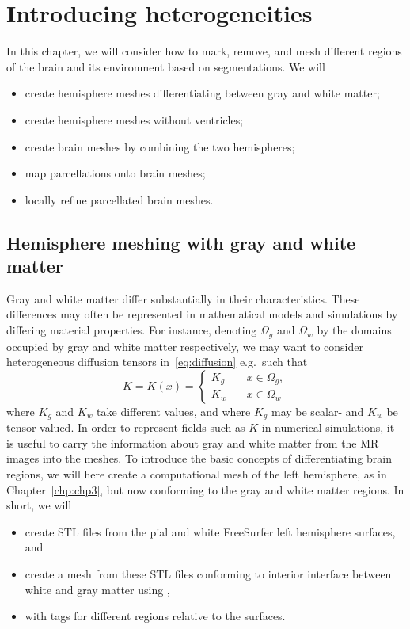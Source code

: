 \chapter{Introducing heterogeneities}
\label{chp:chp4}

In this chapter, we will consider how to mark, remove, and mesh
different regions of the brain and its environment based on
{\freesurfer} segmentations. We will
\begin{itemize}
\item
  create hemisphere meshes differentiating between gray and white matter;
\item
  create hemisphere meshes without ventricles;
\item
  create brain meshes by combining the two hemispheres;
\item
  map parcellations onto brain meshes;
\item
  locally refine parcellated brain meshes.
\end{itemize}

\section{Hemisphere meshing with gray and white matter}
\label{sec:chp4:tools:gray-white}

Gray and white matter differ substantially in their
characteristics. These differences may often be represented in
mathematical models and simulations by differing material
properties. For instance, denoting $\Omega_g$ and $\Omega_w$ by the
domains occupied by gray and white matter respectively, we may want to
consider heterogeneous diffusion tensors in~\eqref{eq:diffusion}
e.g.~such that
\begin{equation}
  \label{eq:K}
  K = K(x) = \left \{
    \begin{matrix}
      K_g & \quad x \in \Omega_g, \\
      K_w & \quad x \in \Omega_w 
    \end{matrix}
    \right .
\end{equation}
where $K_g$ and $K_w$ take different values, and where $K_g$ may be
scalar- and $K_w$ be tensor-valued. In order to represent fields such
as $K$ in numerical simulations, it is useful to carry the information
about gray and white matter from the MR images into the meshes. To
introduce the basic concepts of differentiating brain regions, we will
here create a computational mesh of the left hemisphere, as in
Chapter~\ref{chp:chp3}, but now conforming to the gray and white
matter regions. In short, we will
\begin{itemize}
\item
  create STL files from the pial and white FreeSurfer left hemisphere
  surfaces, and
\item
  create a mesh from these STL files conforming to interior interface
  between white and gray matter using \svmtk{},
\item
  with tags for different regions relative to the surfaces.
\end{itemize}

